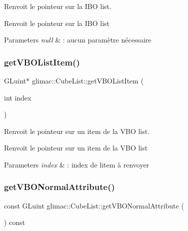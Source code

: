Renvoit le pointeur sur la I\+BO list. 

Renvoit le pointeur sur la I\+BO list


\begin{DoxyParams}{Parameters}
{\em null} & \+: aucun paramètre nécessaire \\
\hline
\end{DoxyParams}
\mbox{\label{classglimac_1_1CubeList_a33f8d08aac4744c18d18969b0b16517c}} 
\subsubsection{\texorpdfstring{get\+V\+B\+O\+List\+Item()}{getVBOListItem()}}
{\footnotesize\ttfamily G\+Luint$\ast$ glimac\+::\+Cube\+List\+::get\+V\+B\+O\+List\+Item (\begin{DoxyParamCaption}\item[{int}]{index }\end{DoxyParamCaption})\hspace{0.3cm}{\ttfamily [inline]}}



Renvoit le pointeur sur un item de la V\+BO list. 

Renvoit le pointeur sur un item de la V\+BO list


\begin{DoxyParams}{Parameters}
{\em index} & \+: index de l\textquotesingle{}item à renvoyer \\
\hline
\end{DoxyParams}
\mbox{\label{classglimac_1_1CubeList_a48e789d3c98e4dd5230299d48da5fbb5}} 
\subsubsection{\texorpdfstring{get\+V\+B\+O\+Normal\+Attribute()}{getVBONormalAttribute()}}
{\footnotesize\ttfamily const G\+Luint glimac\+::\+Cube\+List\+::get\+V\+B\+O\+Normal\+Attribute (\begin{DoxyParamCaption}{ }\end{DoxyParamCaption}) const\hspace{0.3cm}{\ttfamily [inline]}}



